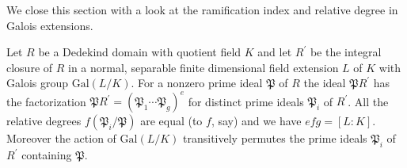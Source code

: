 We close this section with a look at the ramification index and relative degree in Galois extensions.
\begin{theorem}
Let $R$ be a Dedekind domain with quotient field $K$ and let $R^\prime$ be the integral closure of $R$ in a normal, separable finite dimensional field extension $L$ of $K$ with Galois group $\mathrm{Gal}(L/K)$. For a nonzero prime ideal $\mathfrak{P}$ of $R$ the ideal $\mathfrak{P}R^\prime$ has the factorization $\mathfrak{P} R^{\prime}=\left( \mathfrak{P} _1\cdots \mathfrak{P} _g \right) ^e$ for distinct prime ideals $\mathfrak{P}_i$ of $R^\prime$. All the relative degrees $f(\mathfrak{P}_i/\mathfrak{P})$ are equal (to $f$, say) and we have $efg=[L:K]$. Moreover the action of $\mathrm{Gal}(L/K)$ transitively permutes the prime ideals $\mathfrak{P}_i$ of $R^\prime$ containing $\mathfrak{P}$.
\end{theorem}
